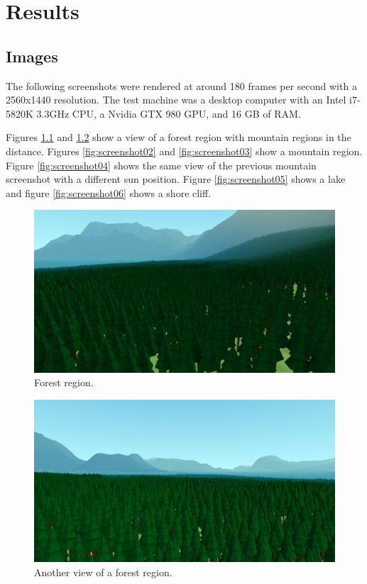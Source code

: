 \chapter{Results} \label{results}

\section{Images}

The following screenshots were rendered at around 180 frames per second with a 2560x1440 resolution.
The test machine was a desktop computer with an Intel i7-5820K 3.3GHz CPU, a Nvidia GTX 980 GPU, and 16 GB of RAM.

Figures \ref{fig:screenshot00} and \ref{fig:screenshot01} show a view of a forest region with mountain regions in the distance.
Figures \ref{fig:screenshot02} and \ref{fig:screenshot03} show a mountain region.
Figure \ref{fig:screenshot04} shows the same view of the previous mountain screenshot with a different sun position.
Figure \ref{fig:screenshot05} shows a lake and figure \ref{fig:screenshot06} shows a shore cliff.

\begin{figure}
	\centering
		\includegraphics[width=1.0\textwidth]{figures/Screenshot000000.png}
	\caption{Forest region.}
	\label{fig:screenshot00}
\end{figure}

\begin{figure}
	\centering
		\includegraphics[width=1.0\textwidth]{figures/Screenshot000001.png}
	\caption{Another view of a forest region.}
	\label{fig:screenshot01}
\end{figure}

